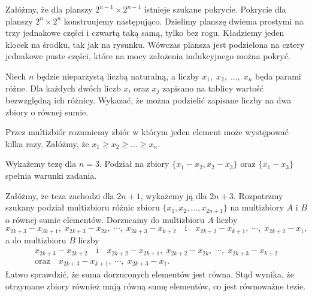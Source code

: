 \noindent
Załóżmy, że dla planszy $2^{n - 1} \times 2^{n - 1}$ istnieje szukane pokrycie. Pokrycie dla planszy $2^{n} \times 2^{n}$ konstruujemy następująco. Dzielimy planszę dwiema prostymi na trzy jednakowe części i czwartą taką samą, tylko bez rogu. Kładziemy jeden klocek na środku, tak jak na rysunku. Wówczas plansza jest podzielona na cztery jednakowe puste części, które na mocy założenia indukcyjnego można pokryć.

\begin{problem}{7}
Niech $n$ będzie nieparzystą liczbą naturalną, a liczby $x_1,\; x_2,\; ...,\; x_n$ będa parami różne. Dla każdych dwóch liczb $x_i$ oraz $x_j$ zapisano na tablicy wartość bezwzględną ich różnicy. Wykazać, że można podzielić zapisane liczby na dwa zbiory o równej sumie.
\end{problem}
\noindent
Przez multizbiór rozumiemy zbiór w którym jeden element może występować kilka razy.
Załóżmy, że $x_1 \geqslant x_2 \geqslant ... \geqslant x_n$. 
\vspace{10px}

\noindent
Wykażemy tezę dla $n = 3$. Podział na zbiory $\{x_1 - x_2, x_2 - x_3\}$ oraz $\{x_1 - x_3\}$ spełnia warunki zadania.
\vspace{10px}

\noindent
Załóżmy, że teza zachodzi dla $2n + 1$, wykażemy ją dla $2n + 3$.
Rozpatrzmy szukany podział multizbioru różnic zbioru $\{x_1, x_2, ..., x_{2n + 1}\}$ na multizbiory $A$ i $B$ o równej sumie elementów.
Dorzucamy do multizbioru $A$ liczby
\[
	{x_{2k+3}-x_{2k+1}, \; x_{2k+3}-x_{2k},\; \cdots, \; x_{2k+3}-x_{k+2}} \quad \text{i} \quad {x_{2k+2}-x_{k+1},\; \cdots, \; x_{2k+2}-x_1},
\]
a do multizbioru $B$ liczby
\begin{gather*}
	x_{2k+3} - x_{2k+2} \quad \text{i} \quad x_{2k+2} - x_{2k+1},\; x_{2k+2} - x_{2k},\; \cdots,\; x_{2k+3} - x_{k+2}  \\ \text{oraz} \quad {x_{2k+3} - x_{k+1},\; \cdots, \; x_{2k+3}-x_1}.
\end{gather*}
Łatwo sprawdzić, że suma dorzuconych elementów jest równa. Stąd wynika, że otrzymane zbiory również mają równą sumę elementów, co jest równoważne tezie.